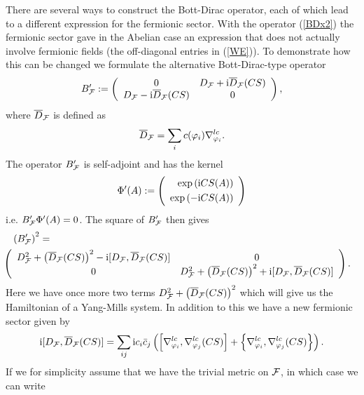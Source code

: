 \documentclass[letterpaper,12pt]{article}
\newcommand{\nn}{\nonumber}
\def\cf{{\cal F}}
\begin{document}
There are several ways to construct the Bott-Dirac operator, each of which lead to a different expression for the fermionic sector. With the operator (\ref{BDx2}) the fermionic sector gave in the Abelian case an expression that does not actually involve fermionic fields (the off-diagonal entries in (\ref{WE})). To demonstrate how this can be changed we formulate the alternative Bott-Dirac-type operator
\begin{eqnarray}
B'_{\cf} :=   \left(
\begin{array}{cc}
 0  &  D_\cf + \mathrm{i} \overline{D}_\cf(CS)  \\ 
D_\cf - \mathrm{i} \overline{D}_\cf(CS)   &  0
\end{array}
\right),
\label{solpanel}
\end{eqnarray}
where $\overline{D}_\cf$ is defined as
$$
\overline{D}_{\cf}  = \sum_i {c}(\varphi_i) \nabla^{lc}_{\varphi_i}  .
$$
The operator $B'_\cf$ is self-adjoint and has the kernel
$$
\Phi'(A) := \left(
\begin{array}{r}
\exp \left( \mathrm{i}  CS(A)\right)   
\vspace{0,1cm}
\\
 \exp\left(- \mathrm{i} CS(A)\right)   
\end{array}
\right) 
$$
i.e.
$B'_\cf\Phi'(A) =0$. The square of $B'_\cf$ then gives
\begin{eqnarray*}
\left(B'_\cf\right)^2 &=&
\nn\\
&&\hspace{-2cm}
\left(
\begin{array}{cc}
 D_\cf^2 + \left(\overline{D}_{\cf} (CS)\right)^2 - \mathrm{i}[D_\cf,\overline{D}_{\cf} (CS)]  &  0  \\ 
0   &  D_\cf^2 + \left(\overline{D}_{\cf} (CS)\right)^2 + \mathrm{i}[D_\cf,\overline{D}_{\cf} (CS)]
\end{array}
\right).
\end{eqnarray*}
Here we have once more two terms $D_\cf^2 + \left(\overline{D}_{\cf} (CS)\right)^2$ which will give us the Hamiltonian of a Yang-Mills system. In addition to this we have a new fermionic sector given by
\begin{equation}
\mathrm{i}[D_\cf,\overline{D}_{\cf} (CS)] = \sum_{ij} \mathrm{i} c_i \bar{c}_j \left( \left[\nabla^{lc}_{\varphi_i}, \nabla^{lc}_{\varphi_j}(CS)\right] + \left\{\nabla^{lc}_{\varphi_i}, \nabla^{lc}_{\varphi_j}(CS)\right\}  \right).
\label{bobbob}
\end{equation}
If we for simplicity assume that we have the trivial metric on $\cf$, in which case we can write
\end{document}
